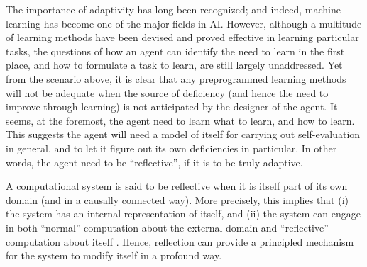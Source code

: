 \documentclass{llncs}
\begin{document}

The importance of adaptivity has long been recognized; and indeed, machine
learning has become one of the major fields in AI.  However, although a
multitude of learning methods have been devised and proved effective in
learning particular tasks, the questions of how an agent can identify the
need to learn in the first place, and how to formulate a task to learn, are
still largely unaddressed.  Yet from the scenario above, it is clear that
any preprogrammed learning methods will not be adequate when the source of
deficiency (and hence the need to improve through learning) is not
anticipated by the designer of the agent.  It seems, at the foremost, the
agent need to learn what to learn, and how to learn.  This suggests the
agent will need a model of itself for carrying out self-evaluation in
general, and to let it figure out its own deficiencies in particular.  In
other words, the agent need to be ``reflective'', if it is to be truly
adaptive.

A computational system is said to be reflective when it is itself part of
its own domain (and in a causally connected way).  More precisely, this
implies that (i) the system has an internal representation of itself, and
(ii) the system can engage in both {}``normal'' computation about the
external domain and {}``reflective'' computation about itself
\cite{maes1988:computational_reflection}.  Hence, reflection can provide a
principled mechanism for the system to modify itself in a profound way.
\end{document}
